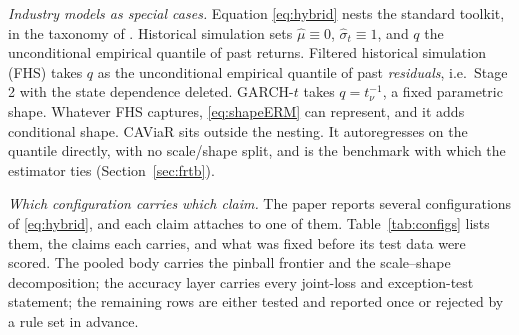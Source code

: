 \documentclass[11pt]{article}
\theoremstyle{remark}
\begin{document}
\noindent\emph{Industry models as special cases.} Equation \eqref{eq:hybrid} nests the standard toolkit, in the taxonomy of \citet{kuester2006}. Historical simulation sets $\widehat{\mu}\equiv 0$, $\widehat{\sigma}_t \equiv 1$, and $q$ the unconditional empirical quantile of past returns. Filtered historical simulation (FHS) \citep{baroneadesi1999fhs, hullwhite1998} takes $q$ as the unconditional empirical quantile of past \emph{residuals}, i.e.\ Stage 2 with the state dependence deleted. GARCH-$t$ \citep{bollerslev1987} takes $q = t_\nu^{-1}$, a fixed parametric shape. Whatever FHS captures, \eqref{eq:shapeERM} can represent, and it adds conditional shape. CAViaR \citep{engle2004caviar} sits outside the nesting. It autoregresses on the quantile directly, with no scale/shape split, and is the benchmark with which the estimator ties (Section~\ref{sec:frtb}).

\medskip\noindent{}

\medskip\noindent\emph{Which configuration carries which claim.} The paper reports several configurations of \eqref{eq:hybrid}, and each claim attaches to one of them. Table~\ref{tab:configs} lists them, the claims each carries, and what was fixed before its test data were scored. The pooled body carries the pinball frontier and the scale--shape decomposition; the accuracy layer carries every joint-loss and exception-test statement; the remaining rows are either tested and reported once or rejected by a rule set in advance.
\end{document}

